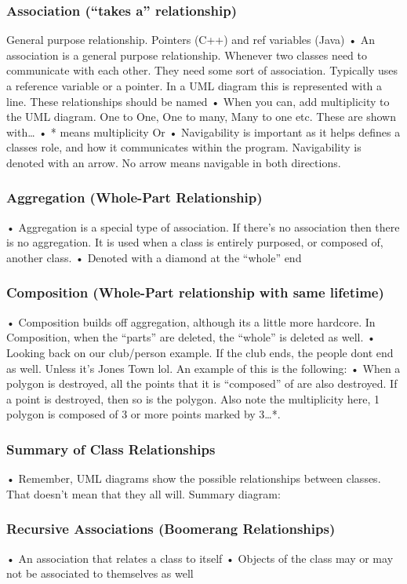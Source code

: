 \documentclass[11pt]{article}
\begin{document}
\subsubsection{Association (“takes a” relationship)}
General purpose relationship. Pointers (C++) and ref variables (Java)
• An association is a general purpose relationship. Whenever two classes need to communicate with
each other. They need some sort of association. Typically uses a reference variable or a pointer. In a
UML diagram this is represented with a line. These relationships should be named
• When you can, add multiplicity to the UML diagram. One to One, One to many, Many to one etc. These
are shown with…
• * means multiplicity
Or
• Navigability is important as it helps defines a classes role, and how it communicates within the program.
Navigability is denoted with an arrow. No arrow means navigable in both directions.
\subsubsection{Aggregation (Whole-Part Relationship)}
• Aggregation is a special type of association. If there's no association then there is no aggregation. It
is used when a class is entirely purposed, or composed of, another class.
• Denoted with a diamond at the “whole” end
\subsubsection{Composition (Whole-Part relationship with same lifetime)}
• Composition builds off aggregation, although its a little more hardcore. In Composition, when the
“parts” are deleted, the “whole” is deleted as well.
• Looking back on our club/person example. If the club ends, the people dont end as well. Unless it’s
Jones Town lol.
An example of this is the following:
• When a polygon is destroyed, all the points that it is “composed” of are also destroyed. If a point is
destroyed, then so is the polygon. Also note the multiplicity here, 1 polygon is composed of 3 or more
points marked by 3…*.
\subsubsection{Summary of Class Relationships}
• Remember, UML diagrams show the possible relationships between classes. That doesn't mean that
they all will.
Summary diagram:
\subsubsection{Recursive Associations (Boomerang Relationships)}
• An association that relates a class to itself
• Objects of the class may or may not be associated to themselves as well
\end{document}
